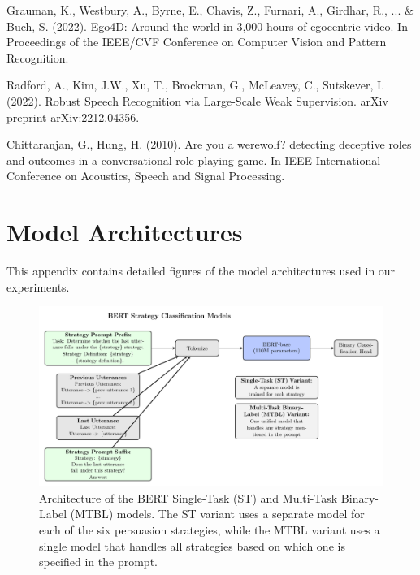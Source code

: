 \documentclass{article}
\begin{document}
\begin{thebibliography}{10}
Grauman, K., Westbury, A., Byrne, E., Chavis, Z., Furnari, A., Girdhar, R., ... \& Buch, S. (2022). Ego4D: Around the world in 3,000 hours of egocentric video. In Proceedings of the IEEE/CVF Conference on Computer Vision and Pattern Recognition.

Radford, A., Kim, J.W., Xu, T., Brockman, G., McLeavey, C., Sutskever, I. (2022). Robust Speech Recognition via Large-Scale Weak Supervision. arXiv preprint arXiv:2212.04356.

Chittaranjan, G., Hung, H. (2010). Are you a werewolf? detecting deceptive roles and outcomes in a conversational role-playing game. In IEEE International Conference on Acoustics, Speech and Signal Processing.

\end{thebibliography}

\appendix
\section{Model Architectures}
This appendix contains detailed figures of the model architectures used in our experiments.

\begin{figure}[H]
    \centering
    \includegraphics[width=\textwidth]{figures/pdf/bert_st_and_mtbl.pdf}
    \caption{Architecture of the BERT Single-Task (ST) and Multi-Task Binary-Label (MTBL) models. The ST variant uses a separate model for each of the six persuasion strategies, while the MTBL variant uses a single model that handles all strategies based on which one is specified in the prompt.}
    \label{fig:app_bert_st_and_mtbl}
\end{figure}
\end{document}
